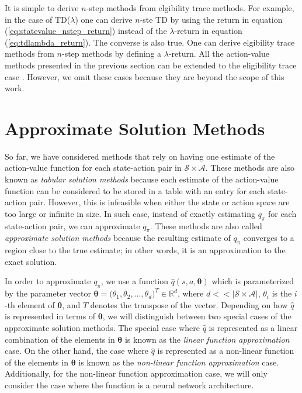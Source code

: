 It is simple to derive $n$-step methods from elgibility trace methods.
For example, in the case of TD($\lambda$) one can derive $n$-ste TD by using the return in equation (\ref{eq:statevalue_nstep_return}) instead of the $\lambda$-return in equation (\ref{eq:tdlambda_return}).
The converse is also true.
One can derive elgibility trace methods from $n$-step methods by defining a $\lambda$-return.
All the action-value methods presented in the previous section can be extended to the eligibility trace case \parencite{rummery1995,precup2000}.
However, we omit these cases because they are beyond the scope of this work.



\section{Approximate Solution Methods}

So far, we have considered methods that rely on having one estimate of the action-value function for each state-action pair in $\mathcal{S} \times \mathcal{A}$.
These methods are also known as \textit{tabular solution methods} because each estimate of the action-value function can be considered to be stored in a table with an entry for each state-action pair.
However, this is infeasible when either the state or action space are too large or infinite in size.
In such case, instead of exactly estimating $q_\pi$ for each state-action pair, we can approximate $q_\pi$.
These methods are also called \textit{approximate solution methods} because the resulting estimate of $q_\pi$ converges to a region close to the true estimate; in other words, it is an approximation to the exact solution.

In order to approximate $q_\pi$, we use a function $\hat{q}(s,a,\boldsymbol{\theta})$ which is parameterized by the parameter vector $\boldsymbol{\theta} = \big( \theta_1, \theta_2, ..., \theta_d \big)^T \in \mathbb{R}^d$, where $d < < |\mathcal{S} \times \mathcal{A}|$, $\theta_i$ is the $i$-th element of $\boldsymbol{\theta}$, and $T$ denotes the transpose of the vector.
Depending on how $\hat{q}$ is represented in terms of $\boldsymbol{\theta}$, we will distinguish between two special cases of the approximate solution methods.
The special case where $\hat{q}$ is represented as a linear combination of the elements in $\boldsymbol{\theta}$ is known as the \textit{linear function approximation} case.
On the other hand, the case where $\hat{q}$ is represented as a non-linear function of the elements in $\boldsymbol{\theta}$ is known as the \textit{non-linear function approximation} case.
Additionally, for the non-linear function approximation case, we will only consider the case where the function is a neural network architecture.

